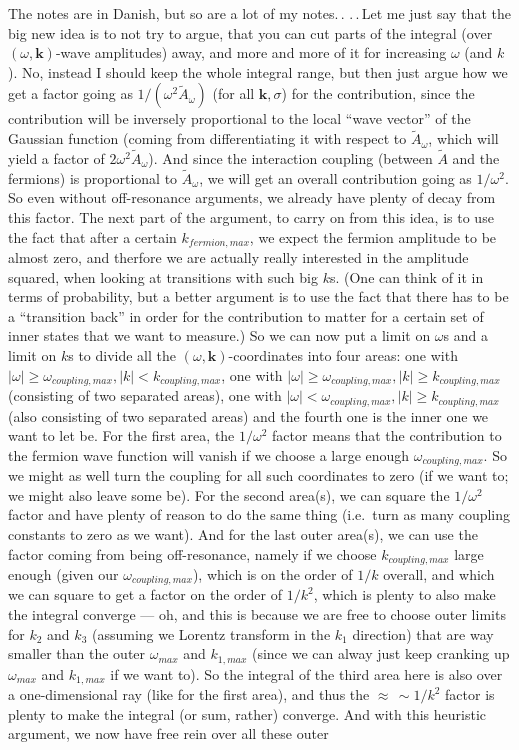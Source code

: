 \documentclass{report}
\begin{document}
The notes are in Danish, but so are a lot of my notes.\,. .\,.\,Let me just say that the big new idea is to not try to argue, that you can cut parts of the integral (over $(\omega, \boldsymbol{k})$-wave amplitudes) away, and more and more of it for increasing $\omega$ (and $k$). No, instead I should keep the whole integral range, but then just argue how we get a factor going as $1/(\omega^2 \tilde A_{\omega})$ (for all $\boldsymbol{k},\sigma$) for the contribution, since the contribution will be inversely proportional to the local ``wave vector'' of the Gaussian function (coming from differentiating it with respect to $\tilde A_{\omega}$, which will yield a factor of $2\omega^2 \tilde A_{\omega}$). And since the interaction coupling (between $\tilde A$ and the fermions) is proportional to $\tilde A_{\omega}$, we will get an overall contribution going as $1/\omega^2$. So even without off-resonance arguments, we already have plenty of decay from this factor. The next part of the argument, to carry on from this idea, is to use the fact that after a certain $k_{fermion, max}$, we expect the fermion amplitude to be almost zero, and therfore we are actually really interested in the amplitude squared, when looking at transitions with such big $k$s. (One can think of it in terms of probability, but a better argument is to use the fact that there has to be a ``transition back'' in order for the contribution to matter for a certain set of inner states that we want to measure.) So we can now put a limit on $\omega$s and a limit on $k$s to divide all the $(\omega, \boldsymbol{k})$-coordinates into four areas: one with $|\omega|\geq\omega_{coupling, max}, |k|<k_{coupling, max}$, one with $|\omega|\geq\omega_{coupling, max}, |k|\geq k_{coupling, max}$ (consisting of two separated areas), one with $|\omega|<\omega_{coupling, max}, |k|\geq k_{coupling, max}$ (also consisting of two separated areas) and the fourth one is the inner one we want to let be. For the first area, the $1/\omega^2$ factor means that the contribution to the fermion wave function will vanish if we choose a large enough $\omega_{coupling, max}$. So we might as well turn the coupling for all such coordinates to zero (if we want to; we might also leave some be). For the second area(s), we can square the $1/\omega^2$ factor and have plenty of reason to do the same thing (i.e.\ turn as many coupling constants to zero as we want). And for the last outer area(s), we can use the factor coming from being off-resonance, namely if we choose $k_{coupling, max}$ large enough (given our $\omega_{coupling, max}$), which is on the order of $1/k$ overall, and which we can square to get a factor on the order of $1/k^2$, which is plenty to also make the integral converge --- oh, and this is because we are free to choose outer limits for $k_2$ and $k_3$ (assuming we Lorentz transform in the $k_1$ direction) that are way smaller than the outer $\omega_{max}$ and $k_{1, max}$ (since we can alway just keep cranking up $\omega_{max}$ and $k_{1, max}$ if we want to). So the integral of the third area here is also over a one-dimensional ray (like for the first area), and thus the $\approx\,\sim \!1/k^2$ factor is plenty to make the integral (or sum, rather) converge. And with this heuristic argument, we now have free rein over all these outer 
\end{document}
